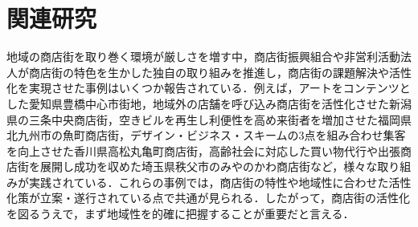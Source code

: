 \section{関連研究}

地域の商店街を取り巻く環境が厳しさを増す中，商店街振興組合や非営利活動法人が商店街の特色を生かした独自の取り組みを推進し，商店街の課題解決や活性化を実現させた事例はいくつか報告されている\cite{福川2018}．例えば，アートをコンテンツとした愛知県豊橋中心市街地，地域外の店舗を呼び込み商店街を活性化させた新潟県の三条中央商店街，空きビルを再生し利便性を高め来街者を増加させた福岡県北九州市の魚町商店街，デザイン・ビジネス・スキームの3点を組み合わせ集客を向上させた香川県高松丸亀町商店街，高齢社会に対応した買い物代行や出張商店街を展開し成功を収めた埼玉県秩父市のみやのかわ商店街など，様々な取り組みが実践されている．これらの事例では，商店街の特性や地域性に合わせた活性化策が立案・遂行されている点で共通が見られる．したがって，商店街の活性化を図るうえで，まず地域性を的確に把握することが重要だと言える．